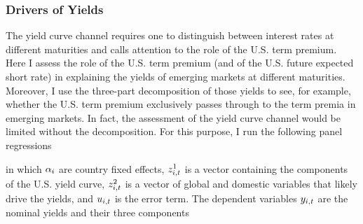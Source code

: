 {\subsubsection{Drivers of Yields}
The yield curve channel requires one to distinguish between interest rates at different maturities and calls attention to the role of the U.S. term premium.
Here I assess the role of the U.S. term premium (and of the U.S. future expected short rate)
in explaining the yields of emerging markets at different maturities.
Moreover, I use the three-part decomposition of those yields to see, for example, whether the U.S. term premium exclusively passes through to the term premia in emerging markets. %
In fact, the assessment of the yield curve channel would be limited without the decomposition.
For this purpose, I run the following panel regressions 

\noindent in which \(\alpha_{i}\) are country fixed effects, \(z^{1}_{i,t}\) is a vector containing the components of the U.S. yield curve, \(z^{2}_{i,t}\) is a vector of global and domestic variables that likely drive the yields, and \(u_{i,t}\) is the error term. 
The dependent variables \(y_{i,t}\) are the nominal yields and their three components 
}
